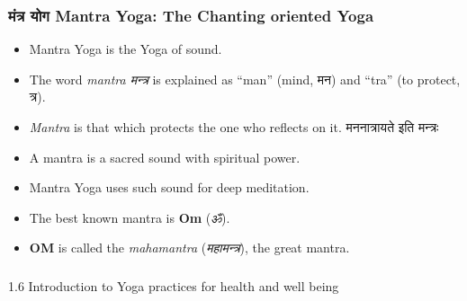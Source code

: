 \begin{frame}[fragile]\frametitle{मंत्र योग Mantra Yoga: The Chanting oriented Yoga}
    
\begin{itemize}
    \item Mantra Yoga is the Yoga of sound.
    \item The word \textit{mantra मन्त्र} is explained as ``man'' (mind, मन) and ``tra'' (to protect, त्र).
    \item \textit{Mantra} is that which protects the one who reflects on it. मननात्रायते इति मन्त्रः
    \item A mantra is a sacred sound with spiritual power.
    \item Mantra Yoga uses such sound for deep meditation.
    \item The best known mantra is \textbf{Om} (\textit{ॐ}).
    \item \textbf{OM} is called the \textit{mahamantra} (\textit{महामन्त्र}), the great mantra.
\end{itemize}
    
\end{frame}



\begin{frame}[fragile]\frametitle{}
\begin{center}
{\Large 1.6 Introduction to Yoga practices for health and well being}
\end{center}
\end{frame}


